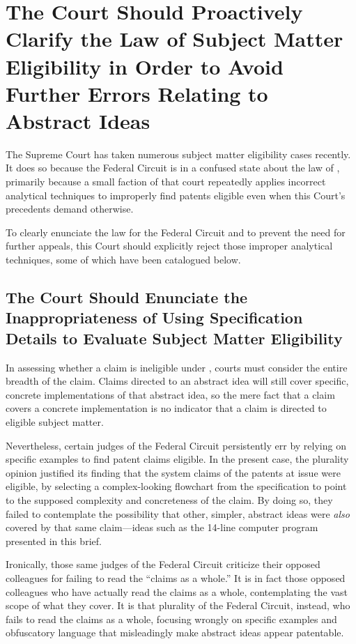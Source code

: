 \documentclass{scotus}
\begin{document}
%
%
\section{The Court Should Proactively Clarify the Law of Subject Matter
Eligibility in Order to Avoid Further Errors Relating to Abstract Ideas}

The Supreme Court has taken numerous subject matter eligibility cases recently.
It does so because the Federal Circuit is in a confused state about the law of
, primarily because a small faction of that court repeatedly applies
incorrect analytical techniques to improperly find patents eligible even when
this Court's precedents demand otherwise.

To clearly enunciate the law for the Federal Circuit and to prevent the need for
further appeals, this Court should explicitly reject those improper analytical
techniques, some of which have been catalogued below.



%
%
\subsection{The Court Should Enunciate the Inappropriateness of Using
Specification Details to Evaluate Subject Matter Eligibility}

In assessing whether a claim is ineligible under , courts must
consider the entire breadth of the claim. Claims directed to an abstract idea
will still cover specific, concrete implementations of that abstract idea, so
the mere fact that a claim covers a concrete implementation is no indicator that
a claim is directed to eligible subject matter.

Nevertheless, certain judges of the Federal Circuit persistently err by relying
on specific examples to find patent claims eligible. In the present case, the
plurality opinion justified its finding that the system claims of the patents at
issue were eligible, by selecting a complex-looking flowchart from the
specification to point to the supposed complexity and concreteness of the claim.
By doing so, they failed to contemplate the possibility that other, simpler,
abstract ideas were \emph{also} covered by that same claim---ideas such as the
14-line computer program presented in this brief.

Ironically, those same judges of the Federal Circuit criticize their opposed
colleagues for failing to read the ``claims as a whole.'' It is in fact those
opposed colleagues who have actually read the claims as a whole, contemplating
the vast scope of what they cover. It is that plurality of the Federal Circuit,
instead, who fails to read the claims as a whole, focusing wrongly on specific
examples and obfuscatory language that misleadingly make abstract ideas appear
patentable.
\end{document}
